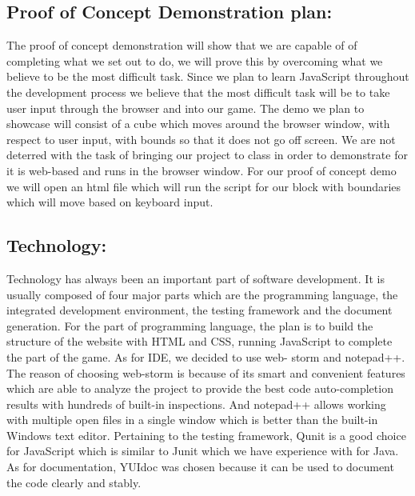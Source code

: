 \documentclass{article}
\begin{document}
\subsection*{Proof of Concept Demonstration plan:}  
The proof of concept
demonstration will show that we are capable of of completing what we set out to
do, we will prove this  by overcoming what we believe to be the most difficult
task. Since we plan to learn JavaScript throughout the development process we 
believe that the most difficult task will be to take user input through the
browser and into our game. The demo we plan to showcase will consist of a cube
which moves around the browser window, with respect to user input, with bounds
so that it does not go off screen. We are not deterred  with the task of
bringing our project to class in order to demonstrate for it is web-based and
runs in the browser window. For our proof of concept demo we will open an html
file which will run the script for our block with boundaries which will move
based on keyboard input.

\subsection*{Technology:} 
Technology has always been an important part of
software development. It is usually composed of four major parts which are the
programming language, the integrated development environment, the testing
framework and the document generation. For the part of programming language, the
plan is to build the structure of the website with HTML and CSS, running
JavaScript to complete the part of the game. As for IDE, we decided to use web-
storm and notepad++. The reason of choosing web-storm is because of its smart
and convenient features which are able to analyze the project to provide the
best code auto-completion results with hundreds of built-in inspections. And
notepad++ allows working with multiple open files in a single window which is
better than the built-in Windows text editor. Pertaining to the testing framework,
Qunit is a good choice for JavaScript which is similar to Junit which we have
experience with for Java. As for documentation, YUIdoc was chosen because it
can be used to document the code clearly and stably.
\end{document}
